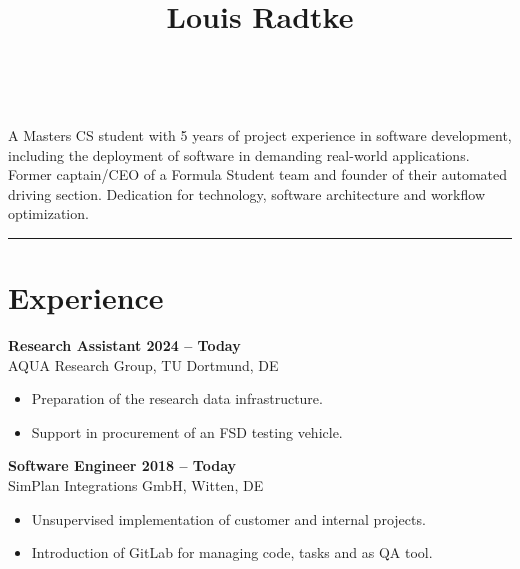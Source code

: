 \documentclass[a4paper,11pt]{article}
\newcommand{\subsectionskip}[0]{\vspace{0.125cm}}
\newcommand{\col}[2]{\textcolor[HTML]{#1}{#2}}
\begin{document}
\hfill
\begin{minipage}[t]{0.65\textwidth}
    \vspace{0cm} %
    \begin{center}
        \title*{\Huge \textbf{Louis Radtke}}\\
    \end{center}

    \vspace{0.125cm}

    {
        \small A Masters CS student with 5 years of project experience in software development, including the deployment of software in demanding real-world applications. Former captain/CEO of a Formula Student team and founder of their automated driving section. Dedication for technology, software architecture and workflow optimization.
    }


    \vspace{0.25cm}
    \hrule

    \section*{\col{ac7448}{Experience}}
    \col{b27c52}{\textbf{Research Assistant \hfill 2024 -- Today}}\\
    AQUA Research Group, TU Dortmund, DE
    \begin{itemize}
        \small
        \item Preparation of the research data infrastructure.
        \item Support in procurement of an FSD testing vehicle.
    \end{itemize}

    \subsectionskip

    \col{b3805b}{\textbf{Software Engineer \hfill 2018 -- Today}} \\
    SimPlan Integrations GmbH, Witten, DE
    \begin{itemize}
        \small
        \item Unsupervised implementation of customer and internal projects.
        \item Introduction of GitLab for managing code, tasks and as QA tool.
    \end{itemize}


\end{minipage}
\end{document}
